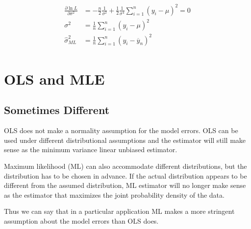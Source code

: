 \documentclass[12pt]{article}
\begin{document}
\begin{align*}
\frac{\partial \ln L }{\partial \sigma^{2} } &=  - \frac{n}{2} \frac{1}{\sigma^{2}}
 + \frac{1}{2}\frac{1}{\sigma^{4}}\sum\limits_{i = 1} ^n (y_{i} - \mu)^{2} = 0\\
 \sigma^{2} &= \frac{1}{n}\sum\limits_{i = 1} ^n (y_{i} - \mu)^{2}	\\
  \widehat{\sigma}_{ML}^{2} &= \frac{1}{n}\sum\limits_{i = 1} ^n (y_{i} -
	\overline{y}_{n})^{2}	\\
\end{align*}





\section{OLS and MLE}

\subsection{Sometimes Different}
OLS does not make a normality assumption for the model errors. OLS can be used under 
different distributional assumptions and the estimator will still make sense as the 
minimum variance linear unbiased estimator.

Maximum likelihood (ML) can also accommodate different distributions, but the 
distribution has to be chosen in advance. If the actual distribution appears to be 
different from the assumed distribution, ML estimator will no longer make sense as the 
estimator that maximizes the joint probability density of the data.

Thus we can say that in a particular application ML makes a more stringent assumption 
about the model errors than OLS does.




%
%
\end{document}
